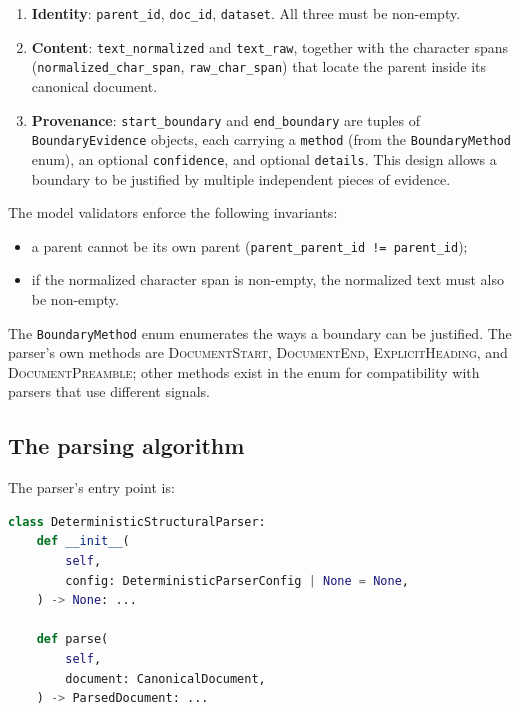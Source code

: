 \documentclass[11pt,a4paper]{article}
\begin{document}
\begin{enumerate}[leftmargin=1.5em,itemsep=0.15em]
  \item \textbf{Identity}: \texttt{parent\_id}, \texttt{doc\_id},
    \texttt{dataset}. All three must be non-empty.
  \item \textbf{Content}: \texttt{text\_normalized} and
    \texttt{text\_raw}, together with the character spans
    (\texttt{normalized\_char\_span}, \texttt{raw\_char\_span}) that
    locate the parent inside its canonical document.
  \item \textbf{Provenance}: \texttt{start\_boundary} and
    \texttt{end\_boundary} are tuples of \texttt{BoundaryEvidence}
    objects, each carrying a \texttt{method} (from the
    \texttt{BoundaryMethod} enum), an optional \texttt{confidence},
    and optional \texttt{details}. This design allows a boundary to
    be justified by multiple independent pieces of evidence.
\end{enumerate}

The model validators enforce the following invariants:

\begin{itemize}[leftmargin=1.5em,itemsep=0.15em]
  \item a parent cannot be its own parent
    (\texttt{parent\_parent\_id != parent\_id});
  \item if the normalized character span is non-empty, the normalized
    text must also be non-empty.
\end{itemize}

The \texttt{BoundaryMethod} enum enumerates the ways a boundary can
be justified. The parser's own methods are
\textsc{DocumentStart}, \textsc{DocumentEnd}, \textsc{ExplicitHeading},
and \textsc{DocumentPreamble}; other methods exist in the enum for
compatibility with parsers that use different signals.

\subsection{The parsing algorithm}
The parser's entry point is:

\begin{lstlisting}[language=python]
class DeterministicStructuralParser:
    def __init__(
        self,
        config: DeterministicParserConfig | None = None,
    ) -> None: ...

    def parse(
        self,
        document: CanonicalDocument,
    ) -> ParsedDocument: ...
\end{lstlisting}
\end{document}
